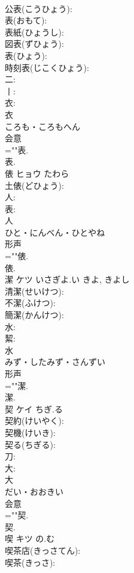 \documentclass[8pt]{extreport}
\begin{document}
\begin{CJK}{UTF8}{min}
\\	公表(こうひょう): 
\\	表(おもて): 
\\	表紙(ひょうし): 
\\	図表(ずひょう): 
\\	表(ひょう): 
\\	時刻表(じこくひょう): 
\\	二: 
\\	丨: 
\\	衣: 
\\	衣	
\\	ころも・ころもへん	
\\	会意 
\\	=""表.
\\	表.
\\	俵	ヒョウ	たわら		
\\	土俵(どひょう): 
\\	人: 
\\	表: 
\\	人	
\\	ひと・にんべん・ひとやね	
\\	形声 
\\	=""俵.
\\	俵.
\\	潔	ケツ	いさぎよ.い	きよ, きよし	
\\	清潔(せいけつ): 
\\	不潔(ふけつ): 
\\	簡潔(かんけつ): 
\\	水: 
\\	絜: 
\\	水	
\\	みず・したみず・さんずい	
\\	形声 
\\	=""潔.
\\	潔.
\\	契	ケイ	ちぎ.る		
\\	契約(けいやく): 
\\	契機(けいき): 
\\	契る(ちぎる): 
\\	刀: 
\\	大: 
\\	大	
\\	だい・おおきい	
\\	会意 
\\	=""契.
\\	契.
\\	喫	キツ	の.む		
\\	喫茶店(きっさてん): 
\\	喫茶(きっさ): 

\end{CJK}
\end{document}
